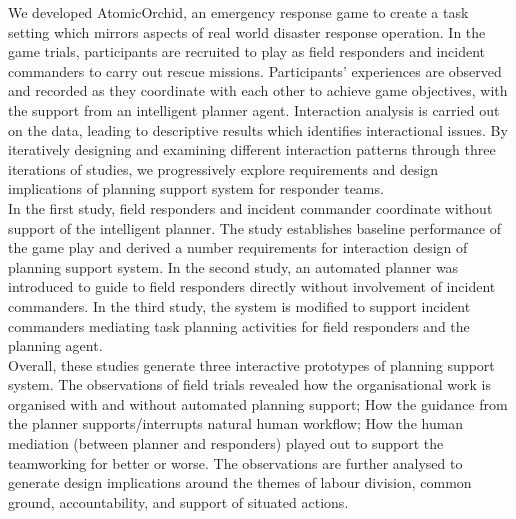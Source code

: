 We developed AtomicOrchid, an emergency response game to create a task setting which mirrors aspects of real world disaster response operation. In the game trials, participants are recruited to play as field responders and incident commanders to carry out rescue missions. Participants' experiences are observed and recorded as they coordinate with each other to achieve game objectives, with the support from an intelligent planner agent. Interaction analysis is carried out on the data, leading to descriptive results which identifies interactional issues. By iteratively designing and examining different interaction patterns through three iterations of studies, we progressively explore requirements and design implications of planning support system for responder teams.\\

In the first study, field responders and incident commander coordinate without support of the intelligent planner. The study establishes baseline performance of the game play and derived a number requirements for interaction design of planning support system. In the second study, an automated planner was introduced to guide to field responders directly without involvement of incident commanders. In the third study, the system is modified to support incident commanders mediating task planning activities for field responders and the planning agent. \\

Overall, these studies generate three interactive prototypes of planning support system. The observations of field trials revealed how the organisational work is organised with and without automated planning support; How the guidance from the planner supports/interrupts natural human workflow; How the human mediation (between planner and responders) played out to support the teamworking for better or worse. The observations are further analysed to generate design implications around the themes of labour division, common ground, accountability, and support of situated actions.\\  


\endgroup			

\vfill